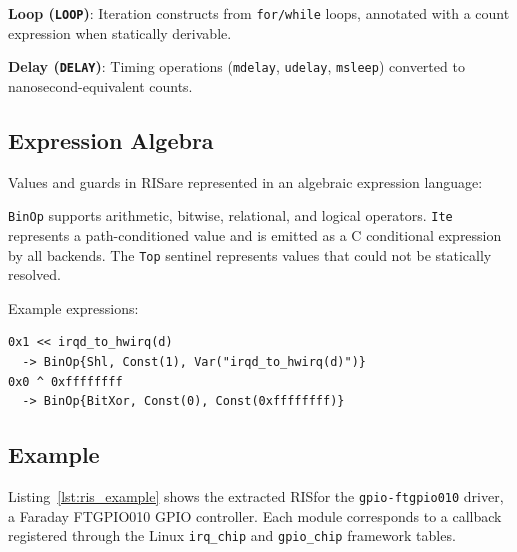 \documentclass[sigconf,review]{acmart}
\newcommand{\rislang}{RIS}
\begin{document}
\textbf{Loop (\texttt{LOOP})}: Iteration constructs from \texttt{for/while} loops, annotated with a count expression when statically derivable.

\textbf{Delay (\texttt{DELAY})}: Timing operations (\texttt{mdelay}, \texttt{udelay}, \texttt{msleep}) converted to nanosecond-equivalent counts.

\subsection{Expression Algebra}

Values and guards in \rislang are represented in an algebraic expression language:

\begin{center}
\end{center}

\texttt{BinOp} supports arithmetic, bitwise, relational, and logical operators. \texttt{Ite} represents a path-conditioned value and is emitted as a C conditional expression by all backends. The \texttt{Top} sentinel represents values that could not be statically resolved.

Example expressions:
\begin{lstlisting}[breaklines=true]
0x1 << irqd_to_hwirq(d)
  -> BinOp{Shl, Const(1), Var("irqd_to_hwirq(d)")}
0x0 ^ 0xffffffff
  -> BinOp{BitXor, Const(0), Const(0xffffffff)}
\end{lstlisting}

\subsection{Example}

Listing~\ref{lst:ris_example} shows the extracted \rislang for the \texttt{gpio-ftgpio010} driver, a Faraday FTGPIO010 GPIO controller. Each module corresponds to a callback registered through the Linux \texttt{irq\_chip} and \texttt{gpio\_chip} framework tables.
\end{document}
